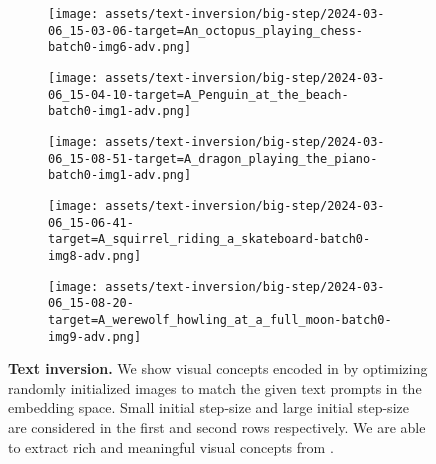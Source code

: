 \begin{figure*}[h]
\vspace{1ex}
\begin{minipage}[t]{.025\textwidth}
     \vspace{0pt}
\end{minipage}%
\hspace{1ex}
\begin{minipage}[t]{0.98\figwidth}
    \vspace{0pt}
    \begin{subfigure}[t]{0.2\textwidth}
        \texttt{[image: assets/text-inversion/big-step/2024-03-06\_15-03-06-target=An\_octopus\_playing\_chess-batch0-img6-adv.png]}
    \end{subfigure}%
    \begin{subfigure}[t]{0.2\textwidth}
        \texttt{[image: assets/text-inversion/big-step/2024-03-06\_15-04-10-target=A\_Penguin\_at\_the\_beach-batch0-img1-adv.png]}
    \end{subfigure}%
    \begin{subfigure}[t]{0.2\textwidth}
        \texttt{[image: assets/text-inversion/big-step/2024-03-06\_15-08-51-target=A\_dragon\_playing\_the\_piano-batch0-img1-adv.png]}
    \end{subfigure}%
    \begin{subfigure}[t]{0.2\textwidth}
        \texttt{[image: assets/text-inversion/big-step/2024-03-06\_15-06-41-target=A\_squirrel\_riding\_a\_skateboard-batch0-img8-adv.png]}
    \end{subfigure}%
    \begin{subfigure}[t]{0.2\textwidth}
        \texttt{[image: assets/text-inversion/big-step/2024-03-06\_15-08-20-target=A\_werewolf\_howling\_at\_a\_full\_moon-batch0-img9-adv.png]}
    \end{subfigure}%
\end{minipage}

\caption{\textbf{Text inversion.} We show visual concepts encoded in \rclip by optimizing randomly initialized images to match the given text prompts in the embedding space. Small initial step-size and large initial step-size are considered in the first and second rows respectively. We are able to extract rich and meaningful visual concepts from \rclip.}
\label{fig:text-inv}
\end{figure*}
